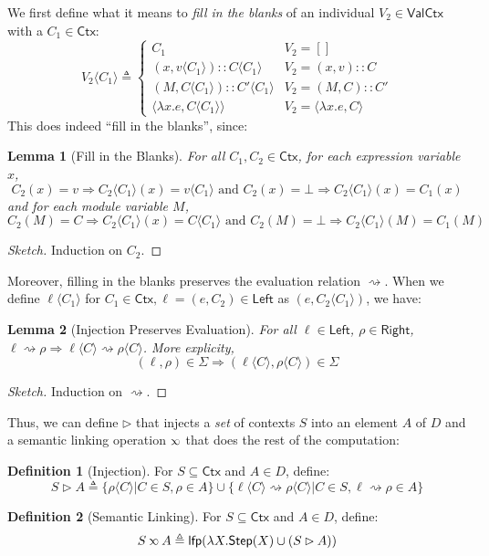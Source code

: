 \documentclass[acmsmall,review]{acmart}\settopmatter{printfolios=true,printccs=false,printacmref=false}
\theoremstyle{definition}
\newtheorem{defn}{Definition}[section]
\theoremstyle{plain}
\newtheorem{lem}{Lemma}[section]
\newcommand*{\cons}{::}
\newcommand*{\Ctx}{\mathsf{Ctx}}
\newcommand*{\Value}{\mathsf{Val}}
\newcommand*{\Left}{\mathsf{Left}}
\newcommand*{\Right}{\mathsf{Right}}
\newcommand*{\lfp}{\mathsf{lfp}}
\newcommand*{\Step}{\mathsf{Step}}
\newcommand*{\semarrow}{\rightsquigarrow}
\newcommand*{\semlink}{\mathbin{\rotatebox[origin=c]{180}{$\propto$}}}
\newcommand*{\inject}[2]{{#2}\langle{#1}\rangle}
\begin{document}
We first define what it means to \emph{fill in the blanks} of an individual $V_2\in\Value\Ctx$ with a $C_1\in\Ctx$:
\[
  \inject{C_{1}}{V_{2}}\triangleq
  \begin{cases}
    C_1                                           & V_{2}=[]                        \\
    (x, \inject{C_1}{v})\cons\inject{C_{1}}{C}    & V_{2}=(x,v)\cons C              \\
    (M, \inject{C_{1}}{C})\cons\inject{C_{1}}{C'} & V_{2}=(M,C)\cons C'             \\
    \langle\lambda x.e,\inject{C_1}{C}\rangle     & V_2=\langle\lambda x.e,C\rangle
  \end{cases}
\]
This does indeed ``fill in the blanks'', since:
\begin{lem}[Fill in the Blanks]
  For all $C_1,C_2\in\Ctx$, for each expression variable $x$,
  \[
    C_2(x)=v\Rightarrow\inject{C_1}{C_2}(x)=\inject{C_1}{v}\text{ and }C_2(x)=\bot\Rightarrow\inject{C_1}{C_2}(x)=C_1(x)
  \]
  and for each module variable $M$,
  \[
    C_2(M)=C\Rightarrow\inject{C_1}{C_2}(x)=\inject{C_1}{C}\text{ and }C_2(M)=\bot\Rightarrow\inject{C_1}{C_2}(M)=C_1(M)
  \]
\end{lem}
\begin{proof}[Sketch]
  Induction on $C_2$.
\end{proof}

Moreover, filling in the blanks preserves the evaluation relation $\semarrow$.
When we define $\inject{C_1}{\ell}$ for $C_1\in\Ctx,\ell=(e,C_2)\in\Left$ as $(e,\inject{C_1}{C_2})$, we have:
\begin{lem}[Injection Preserves Evaluation]
  For all $\ell\in\Left$, $\rho\in\Right$, $\ell\semarrow\rho\Rightarrow\inject{C}{\ell}\semarrow\inject{C}{\rho}$. More explicity,
  \[(\ell,\rho)\in\Sigma\Rightarrow(\inject{C}{\ell},\inject{C}{\rho})\in\Sigma\]
\end{lem}
\begin{proof}[Sketch]
  Induction on $\semarrow$.
\end{proof}

Thus, we can define $\rhd$ that injects a \emph{set} of contexts $S$ into an element $A$ of $D$ and a semantic linking operation $\semlink$ that does the rest of the computation:
\begin{defn}[Injection]
  For $S\subseteq\Ctx$ and $A\in D$, define:
  \[S\rhd A\triangleq\{\inject{C}{\rho}|C\in S,\rho\in A\}\cup\{\inject{C}{\ell}\semarrow\inject{C}{\rho}|C\in S,\ell\semarrow\rho\in A\}\]
\end{defn}
\begin{defn}[Semantic Linking]
  For $S\subseteq\Ctx$ and $A\in D$, define:
  \[S\semlink A\triangleq\lfp(\lambda X.\Step(X)\cup(S\rhd A))\]
\end{defn}
\end{document}

